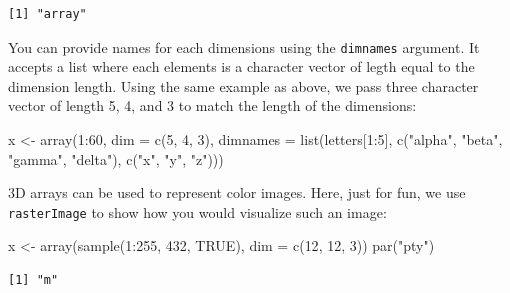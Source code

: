 \documentclass[
]{book}
\newenvironment{Shaded}{\begin{snugshade}}{\end{snugshade}}
\newcommand{\AttributeTok}[1]{\textcolor[rgb]{0.77,0.63,0.00}{#1}}
\newcommand{\ConstantTok}[1]{\textcolor[rgb]{0.00,0.00,0.00}{#1}}
\newcommand{\DecValTok}[1]{\textcolor[rgb]{0.00,0.00,0.81}{#1}}
\newcommand{\FunctionTok}[1]{\textcolor[rgb]{0.00,0.00,0.00}{#1}}
\newcommand{\NormalTok}[1]{#1}
\newcommand{\OtherTok}[1]{\textcolor[rgb]{0.56,0.35,0.01}{#1}}
\newcommand{\SpecialCharTok}[1]{\textcolor[rgb]{0.00,0.00,0.00}{#1}}
\newcommand{\StringTok}[1]{\textcolor[rgb]{0.31,0.60,0.02}{#1}}
\begin{document}
\begin{verbatim}
[1] "array"
\end{verbatim}

You can provide names for each dimensions using the \texttt{dimnames} argument. It accepts a list where each elements is a character vector of legth equal to the dimension length. Using the same example as above, we pass three character vector of length 5, 4, and 3 to match the length of the dimensions:

\begin{Shaded}
\begin{Highlighting}[]
\NormalTok{x }\OtherTok{\textless{}{-}} \FunctionTok{array}\NormalTok{(}\DecValTok{1}\SpecialCharTok{:}\DecValTok{60}\NormalTok{,}
            \AttributeTok{dim =} \FunctionTok{c}\NormalTok{(}\DecValTok{5}\NormalTok{, }\DecValTok{4}\NormalTok{, }\DecValTok{3}\NormalTok{),}
            \AttributeTok{dimnames =} \FunctionTok{list}\NormalTok{(letters[}\DecValTok{1}\SpecialCharTok{:}\DecValTok{5}\NormalTok{],}
                            \FunctionTok{c}\NormalTok{(}\StringTok{"alpha"}\NormalTok{, }\StringTok{"beta"}\NormalTok{, }\StringTok{"gamma"}\NormalTok{, }\StringTok{"delta"}\NormalTok{),}
                            \FunctionTok{c}\NormalTok{(}\StringTok{"x"}\NormalTok{, }\StringTok{"y"}\NormalTok{, }\StringTok{"z"}\NormalTok{)))}
\end{Highlighting}
\end{Shaded}

3D arrays can be used to represent color images. Here, just for fun, we use \texttt{rasterImage} to show how you would visualize such an image:

\begin{Shaded}
\begin{Highlighting}[]
\NormalTok{x }\OtherTok{\textless{}{-}} \FunctionTok{array}\NormalTok{(}\FunctionTok{sample}\NormalTok{(}\DecValTok{1}\SpecialCharTok{:}\DecValTok{255}\NormalTok{, }\DecValTok{432}\NormalTok{, }\ConstantTok{TRUE}\NormalTok{), }\AttributeTok{dim =} \FunctionTok{c}\NormalTok{(}\DecValTok{12}\NormalTok{, }\DecValTok{12}\NormalTok{, }\DecValTok{3}\NormalTok{))}
\FunctionTok{par}\NormalTok{(}\StringTok{"pty"}\NormalTok{)}
\end{Highlighting}
\end{Shaded}

\begin{verbatim}
[1] "m"
\end{verbatim}
\end{document}

